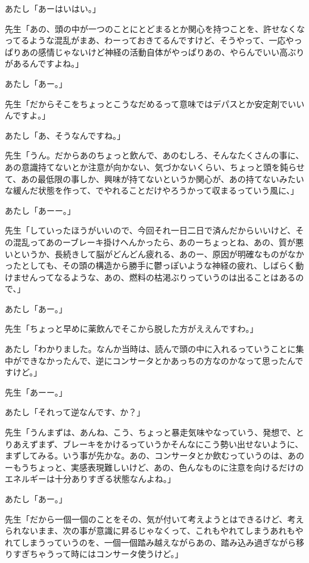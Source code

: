 \documentclass[b5j,twoside,twocolumn]{utarticle}
\begin{document}
\begin{description}
\item あたし「あーはいはい。」
\item 先生「あの、頭の中が一つのことにとどまるとか関心を持つことを、許せなくなってるような混乱がまあ、わーっておきてるんですけど、そうやって、一応やっぱりあの感情じゃないけど神経の活動自体がやっぱりあの、やらんでいい高ぶりがあるんですよね。」
\item あたし「あー。」
\item 先生「だからそこをちょっとこうなだめるって意味ではデパスとか安定剤でいいんですよ。」
\item あたし「あ、そうなんですね。」
\item 先生「うん。だからあのちょっと飲んで、あのむしろ、そんなたくさんの事に、あの意識持てないとか注意が向かない、気づかないくらい、ちょっと頭を鈍らせて、あの最低限の事しか、興味が持てないというか関心が、あの持てないみたいな緩んだ状態を作って、でやれることだけやろうかって収まるっていう風に、」
\item あたし「あーー。」
\item 先生「していったほうがいいので、今回それ一日二日で済んだからいいけど、その混乱ってあのーブレーキ掛けへんかったら、あのーちょっとね、あの、質が悪いというか、長続きして脳がどんどん疲れる、あのー、原因が明確なものがなかったとしても、その頭の構造から勝手に鬱っぽいような神経の疲れ、しばらく動けませんってなるような、あの、燃料の枯渇ぶりっていうのは出ることはあるので、」
\item あたし「あー。」
\item 先生「ちょっと早めに薬飲んでそこから脱した方がええんですわ。」
\item あたし「わかりました。なんか当時は、読んで頭の中に入れるっていうことに集中ができなかったんで、逆にコンサータとかあっちの方なのかなって思ったんですけど。」
\item 先生「あーー。」
\item あたし「それって逆なんです、か？」
\item 先生「うんまずは、あんね、こう、ちょっと暴走気味やなっていう、発想で、とりあえずまず、ブレーキをかけるっていうかそんなにこう勢い出せないように、まずしてみる。いう事が先かな。あの、コンサータとか飲むっていうのは、あのーもうちょっと、実感表現難しいけど、あの、色んなものに注意を向けるだけのエネルギーは十分ありすぎる状態なんよね。」
\item あたし「あー。」
\item 先生「だから一個一個のことをその、気が付いて考えようとはできるけど、考えられないまま、次の事が意識に昇るじゃなくって、これもやれてしまうあれもやれてしまうっていうのを、一個一個踏み越えながらあの、踏み込み過ぎながら移りすぎちゃうって時にはコンサータ使うけど。」

\end{description}
\end{document}

